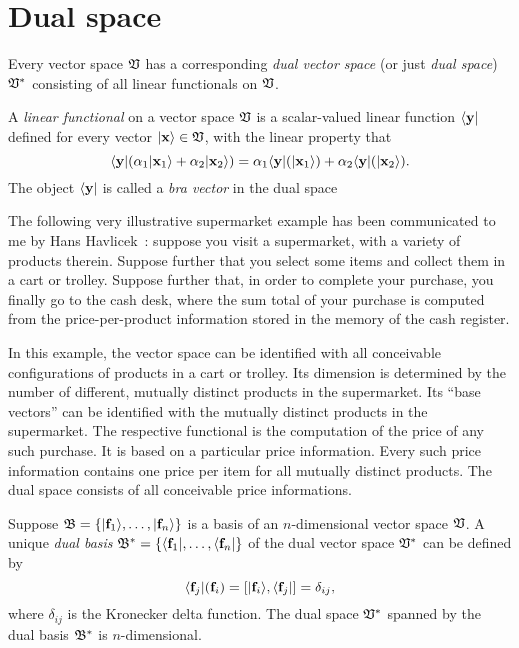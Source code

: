 \section{Dual space}
\label{2011-m-dvs}

Every vector space ${\frak V}$
has a corresponding {\em dual vector space}
(or just {\em dual space})  ${\frak V}^\ast$
consisting of all linear functionals on ${\frak V}$.

A {\em linear functional}
on a vector space ${\frak V}$ is a scalar-valued linear function $\langle {\bf y} \vert$
defined for every vector   $\vert {\bf x} \rangle \in {\frak V}$, with the linear property that
\begin{equation}
\langle {\bf y} \vert (\alpha_1 \vert {\bf x}_1 \rangle +\alpha_2\vert  {\bf x}_2 \rangle)
=
\alpha_1 \langle {\bf y} \vert (\vert {\bf x}_1 \rangle) +\alpha_2 \langle {\bf y} \vert (\vert {\bf x}_2 \rangle) .
\end{equation}
The object $\langle {\bf y} \vert$ is called a {\em bra vector} in the dual space



The following very illustrative supermarket example has been
communicated to me by Hans Havlicek~\cite{havlicek-priv3}:
suppose you visit a supermarket, with a variety of products therein.
Suppose further that you select some items and collect them in a cart or trolley.
Suppose further that, in order to complete your purchase, you finally go to the cash desk,
where the sum total of your purchase is computed from the price-per-product information stored
in the memory of the cash register.

In this example, the vector space can be identified with all conceivable configurations of products in a cart or trolley.
Its dimension is determined by the number of different, mutually distinct products in the supermarket.
Its ``base vectors'' can be identified with the mutually distinct products in the supermarket.
The respective functional is the computation of the price of any such purchase.
It is based on a particular price information.
Every such price information contains one price per item for all mutually distinct products.
The dual space consists of all conceivable price informations.

Suppose
${\frak B} = \{\vert {\bf f}_1 \rangle ,\ldots , \vert {\bf f}_n \rangle \}$
is a basis of an $n$-dimensional vector space  ${\frak V}$.
A unique {\em dual basis}
${\frak B}^\ast
=\{\langle {\bf f}_1 \vert  ,\ldots ,\langle {\bf f}_n\vert  \}$ of the dual vector space ${\frak V}^\ast $
can be defined by
\begin{equation}
\langle {\bf f}_j\vert  ({\bf f}_i) =  [\vert {\bf f}_i \rangle ,  \langle {\bf f}_j\vert  ]=\delta_{ij},
\label{2011-m-Dualbasis-e1}
\end{equation}
where  $\delta_{ij}$
is the Kronecker delta function.
The dual space  ${\frak V}^\ast $ spanned by the dual basis ${\frak B}^\ast $ is $n$-dimensional.


